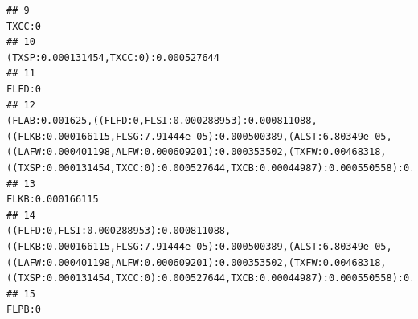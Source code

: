 \documentclass[]{article}
\begin{document}
\begin{verbatim}
## 9                                                                                                                                                                                                                                                                                                                                                                                                                            TXCC:0
## 10                                                                                                                                                                                                                                                                                                                                                                                            (TXSP:0.000131454,TXCC:0):0.000527644
## 11                                                                                                                                                                                                                                                                                                                                                                                                                           FLFD:0
## 12                                                                                          (FLAB:0.001625,((FLFD:0,FLSI:0.000288953):0.000811088,((FLKB:0.000166115,FLSG:7.91444e-05):0.000500389,(ALST:6.80349e-05,((LAFW:0.000401198,ALFW:0.000609201):0.000353502,(TXFW:0.00468318,((TXSP:0.000131454,TXCC:0):0.000527644,TXCB:0.00044987):0.000550558):0.00263375):0.000535248):0.0026018):0.000242145):0.00153256):0.00951218
## 13                                                                                                                                                                                                                                                                                                                                                                                                                 FLKB:0.000166115
## 14                                                                                                                     ((FLFD:0,FLSI:0.000288953):0.000811088,((FLKB:0.000166115,FLSG:7.91444e-05):0.000500389,(ALST:6.80349e-05,((LAFW:0.000401198,ALFW:0.000609201):0.000353502,(TXFW:0.00468318,((TXSP:0.000131454,TXCC:0):0.000527644,TXCB:0.00044987):0.000550558):0.00263375):0.000535248):0.0026018):0.000242145):0.00153256
## 15                                                                                                                                                                                                                                                                                                                                                                                                                           FLPB:0

\end{verbatim}
\end{document}
